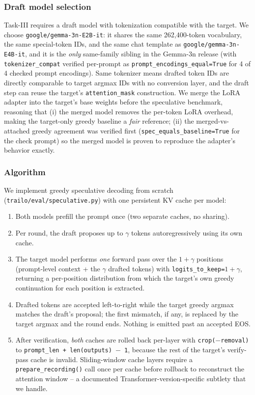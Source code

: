 \documentclass[conference]{IEEEtran}
\newcommand{\code}[1]{\texttt{\small #1}}
\newcommand{\modelname}{\texttt{google/gemma-3n-E4B-it}}
\newcommand{\draftname}{\texttt{google/gemma-3n-E2B-it}}
\begin{document}
\subsubsection{Draft model selection}
Task-III requires a draft model with tokenization compatible with
the target. We choose \draftname{}: it shares the same
262{,}400-token vocabulary, the same special-token IDs, and the
same chat template as \modelname{}, and it is the
\emph{only} same-family sibling in the Gemma-3n release
(with \code{tokenizer\_compat} verified per-prompt as
\code{prompt\_encodings\_equal=True} for 4 of 4 checked
prompt encodings). Same tokenizer means drafted token IDs are
directly comparable to target argmax IDs with no conversion
layer, and the draft step can reuse the target's
\code{attention\_mask} construction. We merge the LoRA adapter
into the target's base weights before the speculative benchmark,
reasoning that (i) the merged model removes the per-token LoRA
overhead, making the target-only greedy baseline a
\emph{fair} reference; (ii) the merged-vs-attached greedy
agreement was verified first (\code{spec\_equals\_baseline=True}
for the check prompt) so the merged model is proven to reproduce
the adapter's behavior exactly.

\subsubsection{Algorithm}
We implement greedy speculative decoding from scratch
(\code{trailo/eval/speculative.py}) with one persistent KV cache
per model:
\begin{enumerate}[leftmargin=*, itemsep=1pt, topsep=2pt]
\item Both models prefill the prompt once (two separate caches,
no sharing).
\item Per round, the draft proposes up to $\gamma$ tokens
autoregressively using its own cache.
\item The target model performs \emph{one} forward pass over the
$1 + \gamma$ positions (prompt-level context + the $\gamma$
drafted tokens) with \code{logits\_to\_keep=$1+\gamma$},
returning a per-position distribution from which the target's
own greedy continuation for each position is extracted.
\item Drafted tokens are accepted left-to-right while the target
greedy argmax matches the draft's proposal; the first mismatch,
if any, is replaced by the target argmax and the round ends.
Nothing is emitted past an accepted EOS.
\item After verification, \emph{both} caches are rolled back
per-layer with \code{crop($-$removal)} to
\code{prompt\_len + len(outputs) $-$ 1}, because the rest of the
target's verify-pass cache is invalid. Sliding-window cache
layers require a \code{prepare\_recording()} call once per cache
before rollback to reconstruct the attention window -- a
documented Transformer-version-specific subtlety that we handle.
\end{enumerate}
\end{document}
